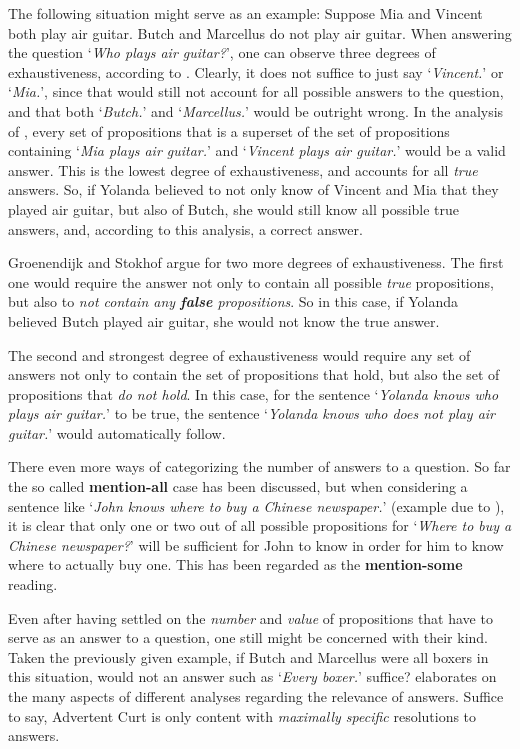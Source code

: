 \documentclass[a4paper]{article}
\newcommand{\stress}{\textbf} %
\newcommand{\term}[1]{\textsf{\textbf{#1}}} %
\newcommand{\pn}{\textsf} %
\newcommand{\example}[1]{`\textit{#1}'} %
\newcommand{\acurt}{\pn{Advertent Curt}}
\theoremstyle{remark}
\theoremstyle{remark}
\theoremstyle{definition}
\theoremstyle{definition}
\begin{document}
The following situation might serve as an example: Suppose Mia and Vincent both
play air guitar. Butch and Marcellus do not play air guitar. When answering the
question \example{Who plays air guitar?}, one can observe three degrees of
exhaustiveness, according to \cite[section 1.5]{gs:sawhq}. Clearly, it does not
suffice to just say \example{Vincent.} or \example{Mia.}, since that would still
not account for all possible answers to the question, and that both
\example{Butch.} and \example{Marcellus.} would be outright wrong. In the
analysis of \cite{karttunen:1977}, every set of propositions that is a superset
of the set of propositions containing \example{Mia plays air guitar.} and
\example{Vincent plays air guitar.} would be a valid answer. This is the lowest
degree of exhaustiveness, and accounts for all \emph{true} answers. So, if
Yolanda believed to not only know of Vincent and Mia that they played air
guitar, but also of Butch, she would still know all possible true answers, and,
according to this analysis, a correct answer.

Groenendijk and Stokhof argue for two more degrees of exhaustiveness. The first
one would require the answer not only to contain all possible \emph{true}
propositions, but also to \emph{not contain any \stress{false} propositions}. So
in this case, if Yolanda believed Butch played air guitar, she would not know
the true answer.

The second and strongest degree of exhaustiveness would
require any set of answers not only to contain the set of propositions that
hold, but also the set of propositions that \emph{do not hold}. In this case, for
the sentence \example{Yolanda knows who plays air guitar.} to be true, the
sentence \example{Yolanda knows who does not play air guitar.} would
automatically follow.

There even more ways of categorizing the number of answers to a question. So far
the so called \term{mention-all} case has been discussed, but when considering
a sentence like \example{John knows where to buy a Chinese newspaper.} (example
due to \cite{rooy:qar}), it is clear that only one or two out of all possible
propositions for \example{Where to buy a Chinese newspaper?} will be sufficient
for John to know in order for him to know where to actually buy one. This has
been regarded as the \term{mention-some} reading.

Even after having settled on the \emph{number} and \emph{value} of propositions
that have to serve as an answer to a question, one still might be concerned with
their kind. Taken the previously given example, if Butch and Marcellus were
all boxers in this situation, would not an answer such as \example{Every boxer.}
suffice? \cite{rooy:qar} elaborates on the many aspects of different analyses
regarding the relevance of answers. Suffice to say, \acurt{} is only content
with \emph{maximally specific} resolutions to answers.
\end{document}
